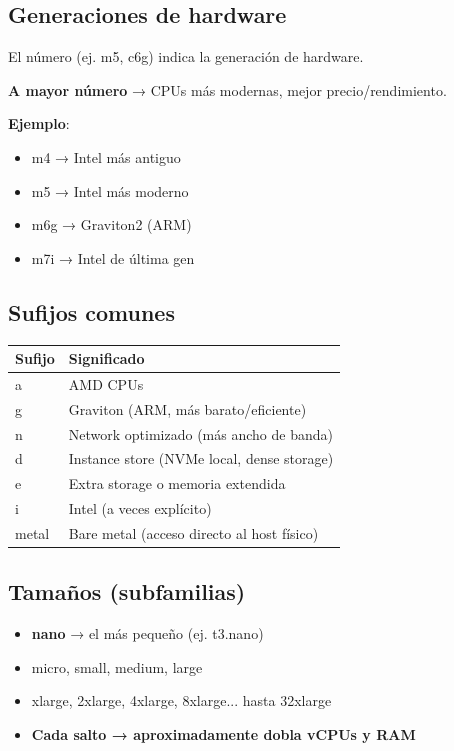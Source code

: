 \documentclass[12pt,a4paper]{report}
\newcommand{\important}[1]{\textcolor{dangerred}{\textbf{#1}}}
\begin{document}
\subsection{Generaciones de hardware}

\begin{awsbox}
El número (ej. m5, c6g) indica la generación de hardware.

\textbf{A mayor número} → CPUs más modernas, mejor precio/rendimiento.

\textbf{Ejemplo}:
\begin{itemize}
    \item m4 → Intel más antiguo
    \item m5 → Intel más moderno
    \item m6g → Graviton2 (ARM)
    \item m7i → Intel de última gen
\end{itemize}
\end{awsbox}

\subsection{Sufijos comunes}

\begin{center}
\begin{longtable}{|p{2cm}|p{8cm}|}
\hline
\cellcolor{awsblue!20}\textbf{Sufijo} & \cellcolor{awsblue!20}\textbf{Significado} \\
\hline
a & AMD CPUs \\
\hline
\cellcolor{successgreen!20}g & Graviton (ARM, más barato/eficiente) \\
\hline
n & Network optimizado (más ancho de banda) \\
\hline
d & Instance store (NVMe local, dense storage) \\
\hline
e & Extra storage o memoria extendida \\
\hline
i & Intel (a veces explícito) \\
\hline
metal & Bare metal (acceso directo al host físico) \\
\hline
\end{longtable}
\end{center}

\subsection{Tamaños (subfamilias)}

\begin{tipbox}
\begin{itemize}
    \item \textbf{nano} → el más pequeño (ej. t3.nano)
    \item micro, small, medium, large
    \item xlarge, 2xlarge, 4xlarge, 8xlarge... hasta 32xlarge
    \item \important{Cada salto → aproximadamente dobla vCPUs y RAM}
\end{itemize}
\end{tipbox}
\end{document}
